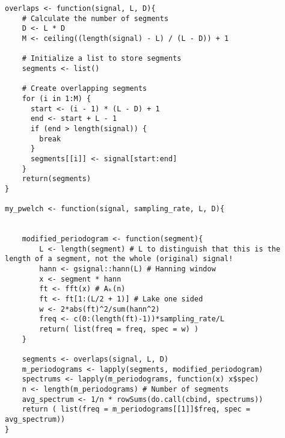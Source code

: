 \documentclass[a4paper, 12pt]{article}
\begin{document}
\begin{verbatim}
overlaps <- function(signal, L, D){
    # Calculate the number of segments
    D <- L * D
    M <- ceiling((length(signal) - L) / (L - D)) + 1
    
    # Initialize a list to store segments
    segments <- list()
    
    # Create overlapping segments
    for (i in 1:M) {
      start <- (i - 1) * (L - D) + 1
      end <- start + L - 1
      if (end > length(signal)) {
        break
      }
      segments[[i]] <- signal[start:end]
    }
    return(segments)
}

my_pwelch <- function(signal, sampling_rate, L, D){
    

    modified_periodogram <- function(segment){
        L <- length(segment) # L to distinguish that this is the length of a segment, not the whole (original) signal!
        hann <- gsignal::hann(L) # Hanning window
        x <- segment * hann
        ft <- fft(x) # Aₖ(n)
        ft <- ft[1:(L/2 + 1)] # Lake one sided
        w <- 2*abs(ft)^2/sum(hann^2)
        freq <- c(0:(length(ft)-1))*sampling_rate/L 
        return( list(freq = freq, spec = w) )
    }

    segments <- overlaps(signal, L, D) 
    m_periodograms <- lapply(segments, modified_periodogram)
    spectrums <- lapply(m_periodograms, function(x) x$spec)
    n <- length(m_periodograms) # Number of segments
    avg_spectrum <- 1/n * rowSums(do.call(cbind, spectrums))
    return ( list(freq = m_periodograms[[1]]$freq, spec = avg_spectrum))
}
\end{verbatim}
\end{document}
